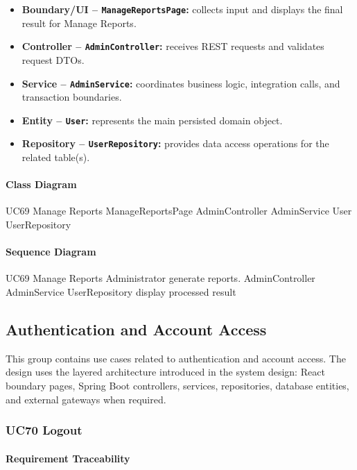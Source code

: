 \begin{itemize}
    \item \textbf{Boundary/UI -- \texttt{ManageReportsPage}:} collects input and displays the final result for Manage Reports.
    \item \textbf{Controller -- \texttt{AdminController}:} receives REST requests and validates request DTOs.
    \item \textbf{Service -- \texttt{AdminService}:} coordinates business logic, integration calls, and transaction boundaries.
    \item \textbf{Entity -- \texttt{User}:} represents the main persisted domain object.
    \item \textbf{Repository -- \texttt{UserRepository}:} provides data access operations for the related table(s).
\end{itemize}

\paragraph{Class Diagram}

\ClassDiagram
{UC69 Manage Reports}
{ManageReportsPage}
{AdminController}
{AdminService}
{User}
{UserRepository}

\paragraph{Sequence Diagram}

\SequenceDiagram
{UC69 Manage Reports}
{Administrator}
{generate reports.}
{AdminController}
{AdminService}
{UserRepository}
{display processed result}

\subsection{Authentication and Account Access}

This group contains use cases related to authentication and account access. The design uses the layered architecture introduced in the system design: React boundary pages, Spring Boot controllers, services, repositories, database entities, and external gateways when required.

\subsubsection{UC70 Logout}

\paragraph{Requirement Traceability}

